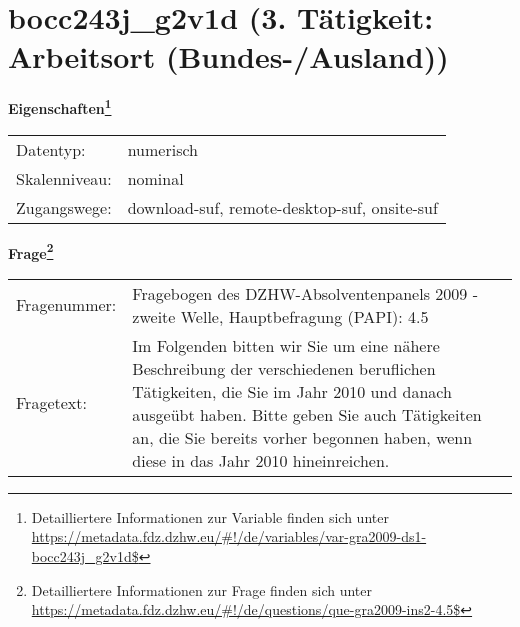 
    \setcounter{footnote}{0}

    \vspace*{-1.8cm}
	\section{bocc243j\_g2v1d (3. Tätigkeit: Arbeitsort (Bundes-/Ausland))}
	\label{section:bocc243j_g2v1d}



    \vspace*{0.5cm}
    \noindent\textbf{Eigenschaften\footnote{Detailliertere Informationen zur Variable finden sich unter
		\url{https://metadata.fdz.dzhw.eu/\#!/de/variables/var-gra2009-ds1-bocc243j_g2v1d$}}}\\
	\begin{tabularx}{\hsize}{@{}lX}
	Datentyp: & numerisch \\
	Skalenniveau: & nominal \\
	Zugangswege: &
	  download-suf, 
	  remote-desktop-suf, 
	  onsite-suf
 \\
    \end{tabularx}



				\vspace*{0.5cm}
                \noindent\textbf{Frage\footnote{Detailliertere Informationen zur Frage finden sich unter
		              \url{https://metadata.fdz.dzhw.eu/\#!/de/questions/que-gra2009-ins2-4.5$}}}\\
				\begin{tabularx}{\hsize}{@{}lX}
					Fragenummer: &
					  Fragebogen des DZHW-Absolventenpanels 2009 - zweite Welle, Hauptbefragung (PAPI):
					  4.5
 \\
					Fragetext: & Im Folgenden bitten wir Sie um eine nähere Beschreibung der verschiedenen beruflichen Tätigkeiten, die Sie im Jahr 2010 und danach ausgeübt haben. Bitte geben Sie auch Tätigkeiten an, die Sie bereits vorher begonnen haben, wenn diese in das Jahr 2010 hineinreichen. \\
				\end{tabularx}






